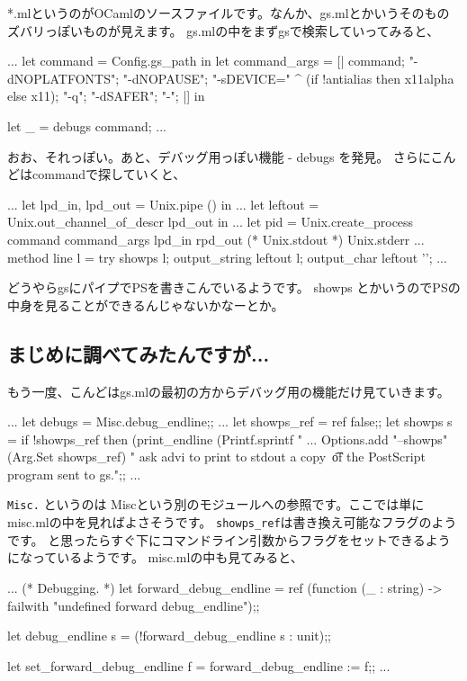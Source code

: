 \documentclass[mingoth,a4paper]{jsarticle}
\begin{document}
*.mlというのがOCamlのソースファイルです。なんか、gs.mlとかいうそのものズバリっぽいものが見えます。
gs.mlの中をまずgsで検索していってみると、

\begin{commandline}
...
  let command = Config.gs_path in
  let command_args =
    [|
      command; 
      "-dNOPLATFONTS"; "-dNOPAUSE";
      "-sDEVICE=" ^ (if !antialias then x11alpha else x11);
      "-q";
      "-dSAFER";
      "-";
    |] in

  let _ = debugs command;
...
\end{commandline}

おお、それっぽい。あと、デバッグ用っぽい機能 - debugs を発見。
さらにこんどはcommandで探していくと、

\begin{commandline}
...
  let lpd_in, lpd_out = Unix.pipe () in
...
  let leftout = Unix.out_channel_of_descr lpd_out in
...
  let pid =
    Unix.create_process command command_args lpd_in rpd_out
      (* Unix.stdout *) Unix.stderr
...
    method line l =
      try
        showps l;
        output_string leftout l;
        output_char leftout '\n';
...
\end{commandline}

どうやらgsにパイプでPSを書きこんでいるようです。
showps とかいうのでPSの中身を見ることができるんじゃないかなーとか。

\subsection{まじめに調べてみたんですが...}

もう一度、こんどはgs.mlの最初の方からデバッグ用の機能だけ見ていきます。

\begin{commandline}
...
let debugs = Misc.debug_endline;;
...
let showps_ref = ref false;;
let showps s =
  if !showps_ref then (print_endline  (Printf.sprintf "%
...
Options.add
  "--showps" (Arg.Set showps_ref)
  "  ask advi to print to stdout a copy\
  \n\t of the PostScript program sent to gs.";;
...
\end{commandline}

\verb|Misc.| というのは Miscという別のモジュールへの参照です。ここでは単にmisc.mlの中を見ればよさそうです。
\verb|showps_ref|は書き換え可能なフラグのようです。
と思ったらすぐ下にコマンドライン引数からフラグをセットできるようになっているようです。
misc.mlの中も見てみると、

\begin{commandline}
...
(* Debugging. *)
let forward_debug_endline =
  ref (function (_ : string) -> failwith "undefined forward debug_endline");;

let debug_endline s = (!forward_debug_endline s : unit);;

let set_forward_debug_endline f = forward_debug_endline := f;;
...
\end{commandline}
\end{document}
